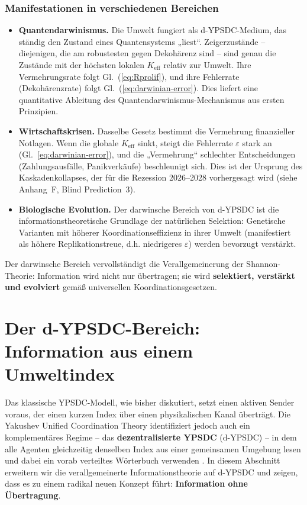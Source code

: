 \documentclass[12pt,a4paper]{article}
\theoremstyle{remark}
\begin{document}
	\subsubsection*{Manifestationen in verschiedenen Bereichen}
	\begin{itemize}[leftmargin=*]
		\item \textbf{Quantendarwinismus.} Die Umwelt fungiert als d-YPSDC-Medium, das ständig den Zustand eines Quantensystems „liest“. Zeigerzustände – diejenigen, die am robustesten gegen Dekohärenz sind – sind genau die Zustände mit der höchsten lokalen \(K_{\mathrm{eff}}\) relativ zur Umwelt. Ihre Vermehrungsrate folgt Gl.~(\ref{eq:Rprolif}), und ihre Fehlerrate (Dekohärenzrate) folgt Gl.~(\ref{eq:darwinian-error}). Dies liefert eine quantitative Ableitung des Quantendarwinismus-Mechanismus aus ersten Prinzipien.
		\item \textbf{Wirtschaftskrisen.} Dasselbe Gesetz bestimmt die Vermehrung finanzieller Notlagen. Wenn die globale \(K_{\mathrm{eff}}\) sinkt, steigt die Fehlerrate \(\varepsilon\) stark an (Gl.~\ref{eq:darwinian-error}), und die „Vermehrung“ schlechter Entscheidungen (Zahlungsausfälle, Panikverkäufe) beschleunigt sich. Dies ist der Ursprung des Kaskadenkollapses, der für die Rezession 2026–2028 vorhergesagt wird (siehe Anhang~F, Blind Prediction~3).
		\item \textbf{Biologische Evolution.} Der darwinsche Bereich von d-YPSDC ist die informationstheoretische Grundlage der natürlichen Selektion: Genetische Varianten mit höherer Koordinationseffizienz in ihrer Umwelt (manifestiert als höhere Replikationstreue, d.h. niedrigeres \(\varepsilon\)) werden bevorzugt verstärkt.
	\end{itemize}
	
	Der darwinsche Bereich vervollständigt die Verallgemeinerung der Shannon-Theorie: Information wird nicht nur übertragen; sie wird \textbf{selektiert, verstärkt und evolviert} gemäß universellen Koordinationsgesetzen.
	
	\section{Der d-YPSDC-Bereich: Information aus einem Umweltindex}
	\label{sec:d-ypsdc-info}
	
	Das klassische YPSDC-Modell, wie bisher diskutiert, setzt einen aktiven Sender voraus, der einen kurzen Index über einen physikalischen Kanal überträgt. Die Yakushev Unified Coordination Theory identifiziert jedoch auch ein komplementäres Regime – das \textbf{dezentralisierte YPSDC} (d-YPSDC) – in dem alle Agenten gleichzeitig denselben Index aus einer gemeinsamen Umgebung lesen und dabei ein vorab verteiltes Wörterbuch verwenden \cite{Appendix_dYPSDC}. In diesem Abschnitt erweitern wir die verallgemeinerte Informationstheorie auf d-YPSDC und zeigen, dass es zu einem radikal neuen Konzept führt: \textbf{Information ohne Übertragung}.
	
\end{document}
